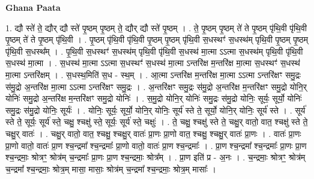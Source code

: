 \documentclass[17pt]{extarticle}
\begin{document}
\textbf{Ghana Paata } \newline

1. द्यौ स्ते॑ ते॒ द्यौर् द्यौ स्ते॑ पृ॒ष्ठम् पृ॒ष्ठम् ते॒ द्यौर् द्यौ स्ते॑ पृ॒ष्ठम् । . ते॒ पृ॒ष्ठम् पृ॒ष्ठम् ते॑ ते पृ॒ष्ठम् पृ॑थि॒वी पृ॑थि॒वी पृ॒ष्ठम् ते॑ ते पृ॒ष्ठम् पृ॑थि॒वी । . पृ॒ष्ठम् पृ॑थि॒वी पृ॑थि॒वी पृ॒ष्ठम् पृ॒ष्ठम् पृ॑थि॒वी स॒धस्थꣳ॑ स॒धस्थ॑म् पृथि॒वी पृ॒ष्ठम् पृ॒ष्ठम् पृ॑थि॒वी स॒धस्थ᳚म् । . पृ॒थि॒वी स॒धस्थꣳ॑ स॒धस्थ॑म् पृथि॒वी पृ॑थि॒वी स॒धस्थ॑ मा॒त्मा ऽऽत्मा स॒धस्थ॑म् पृथि॒वी पृ॑थि॒वी स॒धस्थ॑ मा॒त्मा । . स॒धस्थ॑ मा॒त्मा ऽऽत्मा स॒धस्थꣳ॑ स॒धस्थ॑ मा॒त्मा ऽन्तरि॑क्ष म॒न्तरि॑क्ष मा॒त्मा स॒धस्थꣳ॑ स॒धस्थ॑ मा॒त्मा ऽन्तरि॑क्षम् । . स॒धस्थ॒मिति॑ स॒ध - स्थ॒म् । . आ॒त्मा ऽन्तरि॑क्ष म॒न्तरि॑क्ष मा॒त्मा ऽऽत्मा ऽन्तरि॑क्षꣳ समु॒द्रः स॑मु॒द्रो अ॒न्तरि॑क्ष मा॒त्मा ऽऽत्मा ऽन्तरि॑क्षꣳ समु॒द्रः । . अ॒न्तरि॑क्षꣳ समु॒द्रः स॑मु॒द्रो अ॒न्तरि॑क्ष म॒न्तरि॑क्षꣳ समु॒द्रो योनि॒र् योनिः॑ समु॒द्रो अ॒न्तरि॑क्ष म॒न्तरि॑क्षꣳ समु॒द्रो योनिः॑ । . स॒मु॒द्रो योनि॒र् योनिः॑ समु॒द्रः स॑मु॒द्रो योनिः॒ सूर्यः॒ सूर्यो॒ योनिः॑ समु॒द्रः स॑मु॒द्रो योनिः॒ सूर्यः॑ । . योनिः॒ सूर्यः॒ सूर्यो॒ योनि॒र् योनिः॒ सूर्य॑ स्ते ते॒ सूर्यो॒ योनि॒र् योनिः॒ सूर्य॑ स्ते । . सूर्य॑ स्ते ते॒ सूर्यः॒ सूर्य॑ स्ते॒ चक्षु॒ श्चक्षु॑ स्ते॒ सूर्यः॒ सूर्य॑ स्ते॒ चक्षुः॑ । . ते॒ चक्षु॒ श्चक्षु॑ स्ते ते॒ चक्षु॒र् वातो॒ वात॒ श्चक्षु॑ स्ते ते॒ चक्षु॒र् वातः॑ । . चक्षु॒र् वातो॒ वात॒ श्चक्षु॒ श्चक्षु॒र् वातः॑ प्रा॒णः प्रा॒णो वात॒ श्चक्षु॒ श्चक्षु॒र् वातः॑ प्रा॒णः । . वातः॑ प्रा॒णः प्रा॒णो वातो॒ वातः॑ प्रा॒ण श्च॒न्द्रमा᳚ श्च॒न्द्रमाः᳚ प्रा॒णो वातो॒ वातः॑ प्रा॒ण श्च॒न्द्रमाः᳚ । . प्रा॒ण श्च॒न्द्रमा᳚ श्च॒न्द्रमाः᳚ प्रा॒णः प्रा॒ण श्च॒न्द्रमाः॒ श्रोत्रꣳ॒॒ श्रोत्र॑म् च॒न्द्रमाः᳚ प्रा॒णः प्रा॒ण श्च॒न्द्रमाः॒ श्रोत्र᳚म् । . प्रा॒ण इति॑ प्र - अ॒नः । . च॒न्द्रमाः॒ श्रोत्रꣳ॒॒ श्रोत्र॑म् च॒न्द्रमा᳚ श्च॒न्द्रमाः॒ श्रोत्र॒म् मासा॒ मासाः॒ श्रोत्र॑म् च॒न्द्रमा᳚ श्च॒न्द्रमाः॒ श्रोत्र॒म् मासाः᳚ । \newline
\end{document}
